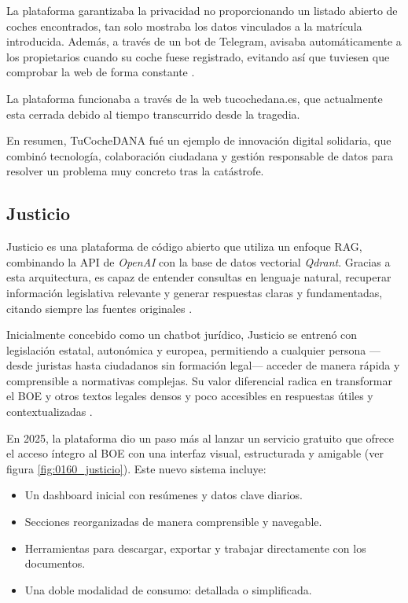     		\noindent La plataforma garantizaba la privacidad no proporcionando un listado abierto de coches encontrados, tan solo mostraba los datos vinculados a la matrícula introducida. Además, a través de un bot de Telegram, avisaba automáticamente a los propietarios cuando su coche fuese registrado, evitando así que tuviesen que comprobar la web de forma constante \cite{0058_tucochedana}.
    		
    		\noindent La plataforma funcionaba a través de la web tucochedana.es, que actualmente esta cerrada debido al tiempo transcurrido desde la tragedia.
    		
    		\noindent En resumen, TuCocheDANA fué un ejemplo de innovación digital solidaria, que combinó tecnología, colaboración ciudadana y gestión responsable de datos para resolver un problema muy concreto tras la catástrofe.
    		
    	\subsection{Justicio}
    	
	    	Justicio \cite{0060_justicio} es una plataforma de código abierto que utiliza un enfoque RAG, combinando la API de \textit{OpenAI} con la base de datos vectorial \textit{Qdrant}. Gracias a esta arquitectura, es capaz de entender consultas en lenguaje natural, recuperar información legislativa relevante y generar respuestas claras y fundamentadas, citando siempre las fuentes originales \cite{0060_justicio2}.
	    	
	    	\noindent Inicialmente concebido como un chatbot jurídico, Justicio se entrenó con legislación estatal, autonómica y europea, permitiendo a cualquier persona —desde juristas hasta ciudadanos sin formación legal— acceder de manera rápida y comprensible a normativas complejas. Su valor diferencial radica en transformar el BOE y otros textos legales densos y poco accesibles en respuestas útiles y contextualizadas \cite{0060_justicio3}.
	    	
	    	\noindent En 2025, la plataforma dio un paso más al lanzar un servicio gratuito que ofrece el acceso íntegro al BOE con una interfaz visual, estructurada y amigable (ver figura \ref{fig:0160_justicio}). Este nuevo sistema incluye:
	    	
	    	\begin{itemize}
	    		\item Un dashboard inicial con resúmenes y datos clave diarios.
	    		\item Secciones reorganizadas de manera comprensible y navegable.
	    		\item Herramientas para descargar, exportar y trabajar directamente con los documentos.
	    		\item Una doble modalidad de consumo: detallada o simplificada.
	    	\end{itemize}
	    	
